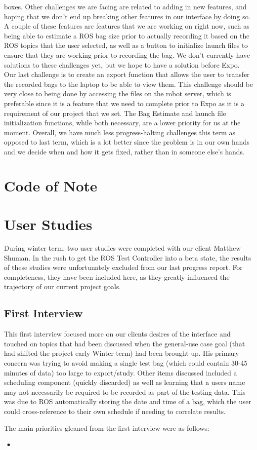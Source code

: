 \documentclass[onecolumn, draftclsnofoot,10pt, compsoc]{IEEEtran}
\begin{document}
boxes. Other challenges we are facing are related to adding in new features, and hoping that we don't end up breaking other features in our interface by doing so. A couple of these features are features that we are working on right now, such as being able to estimate a ROS bag size prior to actually recording it based on the ROS topics that the user selected, as well as a button to initialize launch files to ensure that they are working prior to recording the bag. We don't currently have solutions to these challenges yet, but we hope to have a solution before Expo. Our last challenge is to create an export function that allows the user to transfer the recorded bags to the laptop to be able to view them. This challenge should be very close to being done by accessing the files on the robot server, which is preferable since it is a feature that we need to complete prior to Expo as it is a requirement of our project that we set. The Bag Estimate and launch file initialization functions, while both necessary, are a lower priority for us at the moment. Overall, we have much less progress-halting challenges this term as opposed to last term, which is a lot better since the problem is in our own hands and we decide when and how it gets fixed, rather than in someone else's hands.

\section{Code of Note}

\section{User Studies}
During winter term, two user studies were completed with our client Matthew Shuman. In the rush to get the ROS Test Controller into a beta state, the results of these studies were unfortunately excluded from our last progress report. For completeness, they have been included here, as they greatly influenced the trajectory of our current project goals. 

\subsection{First Interview}
This first interview focused more on our clients desires of the interface and touched on topics that had been discussed when the general-use case goal (that had shifted the project early Winter term) had been brought up. His primary concern was trying to avoid making a single test bag (which could contain 30-45 minutes of data) too large to export/study. Other items discussed included a scheduling component (quickly discarded) as well as learning that a users name may not necessarily be required to be recorded as part of the testing data. This was due to ROS automatically storing the date and time of a bag, which the user could cross-reference to their own schedule if needing to correlate results.

The main priorities gleaned from the first interview were as follows:
\begin{itemize}
	\item 
\end{itemize}

\end{document}
